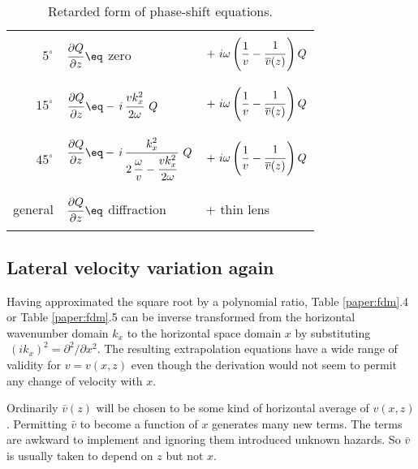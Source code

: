 {\begin{table}
\begin{center}
\begin{tabular}{|r|ll|}
     &     &  \\
$5^\circ$ & $\displaystyle {\strut\partial Q\over
             \partial z} \eq $ zero
& $+\ i\omega \left( \displaystyle {1\over v} - 
  {\strut 1\over\overline{v}(z)} \right) Q$ \\
     &     &   \\   \hline
     &     &   \\
$15^\circ$ & $\displaystyle {\strut\partial Q\over
             \partial z} \eq - \,i\, {\displaystyle 
             {\strut v k_x^2\over 2\omega}} \ Q$ 
& $+\ i\omega \left( \displaystyle {1\over v} - 
  {\strut 1\over\overline{v}(z)} \right) Q$    \\
     &     &   \\      \hline
     &     &   \\
$45^\circ$ & $\displaystyle {\strut\partial Q\over
             \partial z} \eq - \,i\, {\displaystyle 
             {\strut k_x^2}\over\displaystyle 
             {2\,{\omega\over v} - {\strut v k_x^2
             \over 2\omega}}} \ Q$ 
& $+\ i\omega \left(\displaystyle {1\over v} - 
  {\strut 1\over\overline{v}(z)} \right) Q$ \\
     &     &   \\       \hline
     &     &   \\       
{\rm general} & $\displaystyle {\strut\partial Q\over
                \partial z} \eq $ {\rm diffraction} 
 & + {\rm thin lens} \\
     &     &   \\       \hline
\end{tabular}
\end{center}
\label{eqn:1-4}
\caption{Retarded form of phase-shift equations.}
\end{table}
\subsection{Lateral velocity variation again}
\par
Having approximated the square root by a polynomial ratio,
Table \ref{paper:fdm}.4 or Table \ref{paper:fdm}.5 can be inverse transformed
from the horizontal wavenumber domain  $ k_x $  to the
horizontal space domain  $x$  by substituting
$ \  (ik_x )^2  =  \partial^2 / \partial x^2$.
The resulting extrapolation equations have a 
wide range of validity for  $v = v(x,z)$  even though the
derivation would not seem to permit any change of velocity with $x$.
\par
Ordinarily $\bar v(z)$ will be chosen
to be some kind of horizontal average of $v(x,z)$.
Permitting $\bar v$ to become a function of $x$ generates many
new terms.
The terms are awkward to implement and ignoring them introduced
unknown hazards.
So $\bar v$ is usually taken to depend on $z$ but not $x$.
}
